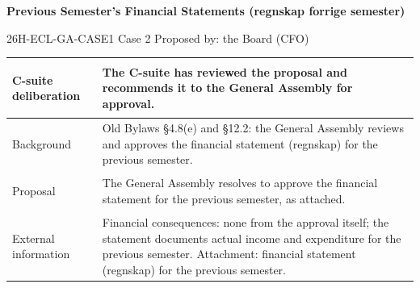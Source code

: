 \documentclass{../../../Common/Latex/Templates/rapport}
\begin{document}
\reportmainmatter
\small
\setlength{\parindent}{0pt}
\setlength{\tabcolsep}{6pt}
\renewcommand{\arraystretch}{1.2}

\begin{center}
  {\Large\bfseries Previous Semester's Financial Statements (regnskap forrige semester)}\par
  \vspace{0.15cm}
  {\normalsize 26H-ECL-GA-CASE1 \textperiodcentered{} Case 2 \textperiodcentered{} Proposed by: the Board (CFO)}\par
  \vspace{0.1cm}
  {\small \meetingline}\par
\end{center}

\vspace{0.3cm}
\begin{tabularx}{\textwidth}{|>{\bfseries\raggedright\arraybackslash}p{4.2cm}|X|}
  \hline
  C-suite deliberation & The C-suite has reviewed the proposal and recommends it to the General Assembly for approval. \\
  \hline
  Background           & Old Bylaws \S4.8(e) and \S12.2: the General Assembly reviews and approves the financial statement (regnskap) for the previous semester. \\
  \hline
  Proposal             & The General Assembly resolves to approve the financial statement for the previous semester, as attached. \\
  \hline
  External information & Financial consequences: none from the approval itself; the statement documents actual income and expenditure for the previous semester. Attachment: financial statement (regnskap) for the previous semester. \\
  \hline
\end{tabularx}
\end{document}
